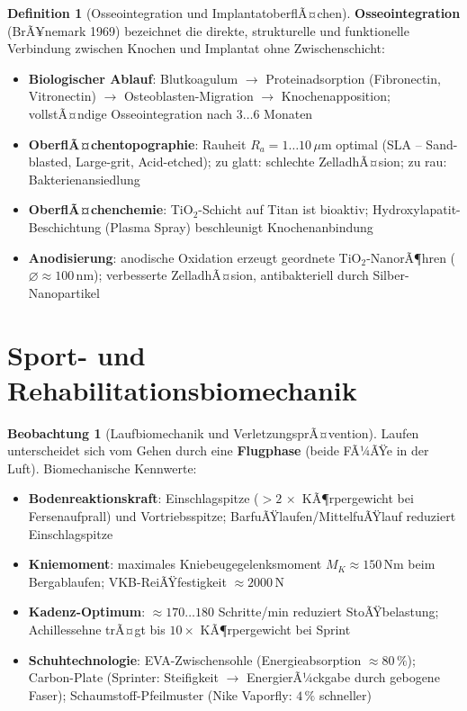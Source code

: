 ﻿\documentclass[a4paper,12pt]{report}
\theoremstyle{definition}
\newtheorem{definition}{Definition}
\newtheorem{beobachtung}{Beobachtung}
\begin{document}
\begin{definition}[Osseointegration und ImplantatoberflÃ¤chen]
\textbf{Osseointegration} (BrÃ¥nemark 1969) bezeichnet die direkte,
strukturelle und funktionelle Verbindung zwischen Knochen und Implantat
ohne Zwischenschicht:
\begin{itemize}
    \item[-] \textbf{Biologischer Ablauf}: Blutkoagulum $\to$ Proteinadsorption
          (Fibronectin, Vitronectin) $\to$ Osteoblasten-Migration $\to$
          Knochenapposition; vollstÃ¤ndige Osseointegration nach $3\ldots6$ Monaten
    \item[-] \textbf{OberflÃ¤chentopographie}: Rauheit $R_a = 1\ldots10\,\mu\mathrm{m}$
          optimal (SLA -- Sand-blasted, Large-grit, Acid-etched);
          zu glatt: schlechte ZelladhÃ¤sion; zu rau: Bakterienansiedlung
    \item[-] \textbf{OberflÃ¤chenchemie}: TiO$_2$-Schicht auf Titan ist bioaktiv;
          Hydroxylapatit-Beschichtung (Plasma Spray) beschleunigt Knochenanbindung
    \item[-] \textbf{Anodisierung}: anodische Oxidation erzeugt geordnete
          TiO$_2$-NanorÃ¶hren ($\varnothing \approx 100\,\mathrm{nm}$);
          verbesserte ZelladhÃ¤sion, antibakteriell durch Silber-Nanopartikel
\end{itemize}
\end{definition}

\section{Sport- und Rehabilitationsbiomechanik}

\begin{beobachtung}[Laufbiomechanik und VerletzungsprÃ¤vention]
Laufen unterscheidet sich vom Gehen durch eine \textbf{Flugphase}
(beide FÃ¼ÃŸe in der Luft). Biomechanische Kennwerte:
\begin{itemize}
    \item[-] \textbf{Bodenreaktionskraft}: Einschlagspitze ($> 2\,\times$ KÃ¶rpergewicht bei Fersenaufprall)
          und Vortriebsspitze; BarfuÃŸlaufen/MittelfuÃŸlauf reduziert Einschlagspitze
    \item[-] \textbf{Kniemoment}: maximales Kniebeugegelenksmoment
          $M_K \approx 150\,\mathrm{Nm}$ beim Bergablaufen; VKB-ReiÃŸfestigkeit $\approx 2000\,\mathrm{N}$
    \item[-] \textbf{Kadenz-Optimum}: $\approx 170\ldots180$ Schritte/min reduziert
          StoÃŸbelastung; Achillessehne trÃ¤gt bis $10\times$ KÃ¶rpergewicht bei Sprint
    \item[-] \textbf{Schuhtechnologie}: EVA-Zwischensohle (Energieabsorption $\approx 80\,\%$);
          Carbon-Plate (Sprinter: Steifigkeit $\to$ EnergierÃ¼ckgabe durch gebogene Faser);
          Schaumstoff-Pfeilmuster (Nike Vaporfly: $4\,\%$ schneller)
\end{itemize}
\end{beobachtung}
\end{document}
